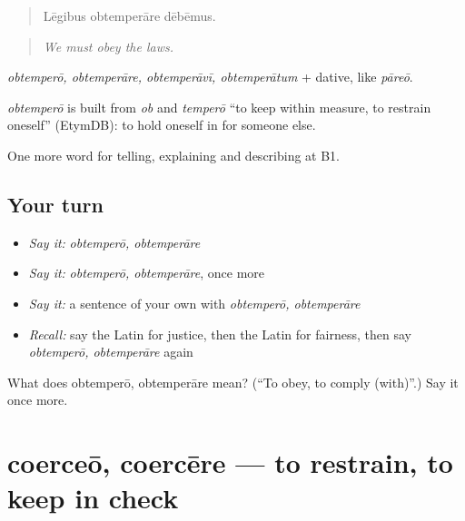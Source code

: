 \begin{quote}
Lēgibus obtemperāre dēbēmus.
\end{quote}

\begin{quote}
\emph{We must obey the laws.}
\end{quote}

\emph{obtemperō, obtemperāre, obtemperāvī, obtemperātum} + dative, like \emph{pāreō}.

\begin{cousinweb}
\emph{obtemperō} is built from \emph{ob} and \emph{temperō} \textquotedblleft{}to keep within measure, to restrain oneself\textquotedblright{} (EtymDB): to hold oneself in for someone else.
\end{cousinweb}

\begin{grammarlens}[title={What you've built}]
One more word for telling, explaining and describing at B1.
\end{grammarlens}

\subsection*{Your turn}
\begin{itemize}
\raggedright
  \item \emph{Say it:} \emph{obtemperō, obtemperāre}
  \item \emph{Say it:} \emph{obtemperō, obtemperāre}, once more
  \item \emph{Say it:} a sentence of your own with \emph{obtemperō, obtemperāre}
  \item \emph{Recall:} say the Latin for justice, then the Latin for fairness, then say \emph{obtemperō, obtemperāre} again
\end{itemize}

\begin{tcolorbox}[breakable,colback=teal!4,colframe=teal!35!black,title={Before you move on}]
What does obtemperō, obtemperāre mean? (\textquotedblleft{}To obey, to comply (with)\textquotedblright{}.) Say it once more.
\end{tcolorbox}
\section[coerceō, coercēre]{coerceō, coercēre — to restrain, to keep in check}

\label{lesson:LA-C416-coerceo}



